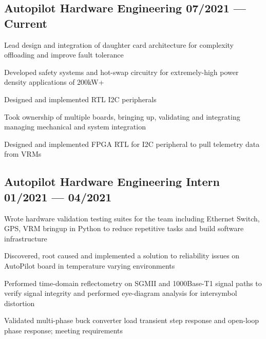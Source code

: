 \documentclass[letter,10pt]{article}
\begin{document}

\subsection{{Autopilot Hardware Engineering \hfill 07/2021 --- Current}}
\begin{zitemize}
\item Lead design and integration of daughter card architecture for complexity offloading and improve fault tolerance
\item Developed safety systems and hot-swap circuitry for extremely-high power density applications of 200kW+
\item Designed and implemented RTL I2C peripherals
\item Took ownership of multiple boards, bringing up, validating and integrating managing mechanical and system integration
\item Designed and implemented FPGA RTL for I2C peripheral to pull telemetry data from VRMs
\end{zitemize}
{\color{sectiondivide} \vspace{-0.75em}\hrulefill}

\subsection{{Autopilot Hardware Engineering Intern \hfill 01/2021 --- 04/2021}}
\begin{zitemize}
\item Wrote hardware validation testing suites for the team including Ethernet Switch, GPS, VRM bringup in Python to reduce repetitive tasks and build software infrastructure
\item Discovered, root caused and implemented a solution to reliability issues on AutoPilot board in temperature varying environments
\item Performed time-domain reflectometry on SGMII and 1000Base-T1 signal paths to verify signal integrity and performed eye-diagram analysis for intersymbol distortion
\item Validated multi-phase buck converter load transient step response and open-loop phase response; meeting requirements
\end{zitemize}
{\color{sectiondivide} \vspace{-0.75em}\hrulefill}
\end{document}
